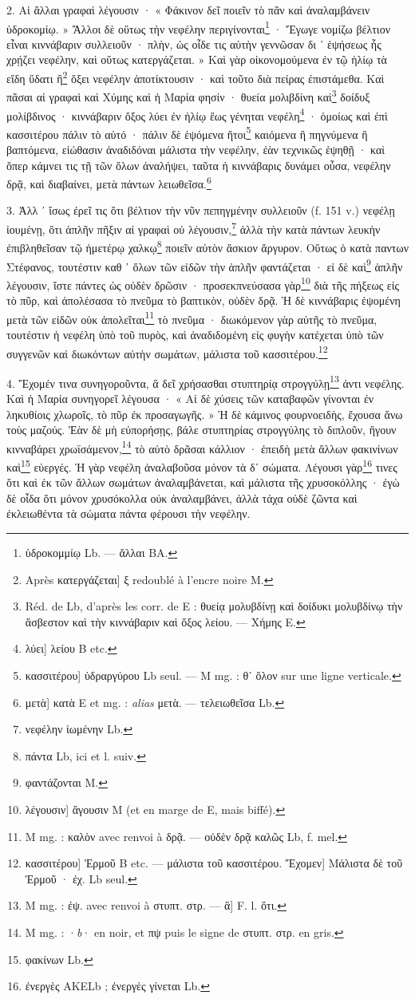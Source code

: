 \documentclass[a4paper, 11pt, oneside, polutonikogreek, french]{article}
\begin{document}
2. Αἱ ἄλλαι γραφαὶ λέγουσιν · « Φάκινον δεῖ ποιεῖν τὸ πᾶν καὶ ἀναλαμβάνειν ὑδροκομίῳ. » Ἄλλοι δὲ οὕτως τὴν νεφέλην περιγίνονται\footnote{ὑδροκομμίῳ Lb. --- ἄλλαι BA.} · Ἔγωγε νομίζω βέλτιον εἶναι κιννάβαριν συλλειοῦν · πλὴν, ὡς οἶδε τις αὐτὴν γεννῶσαν δι ᾽ ἑψήσεως ἧς χρῄζει νεφέλην, καὶ οὕτως κατεργάζεται. » Καὶ γὰρ οἰκονομούμενα ἐν τῷ ἡλίῳ τὰ εἴδη ὕδατι ἢ\footnote{Après κατεργάζεται] ξ redoublé à l'encre noire M.} ὄξει νεφέλην ἀποτίκτουσιν · καὶ τοῦτο διὰ πείρας ἐπιστάμεθα. Καὶ πᾶσαι αἱ γραφαὶ καὶ Χύμης καὶ ἡ Μαρία φησίν · θυεία μολιβδίνη καὶ\footnote{Réd. de Lb, d'après les corr. de E : θυείᾳ μολυβδίνῃ καὶ δοίδυκι μολυβδίνῳ τὴν ἄσβεστον καὶ τὴν κιννάβαριν καὶ ὄξος λείου. --- Χήμης E.} δοίδυξ μολίβδινος · κιννάβαριν ὄξος λύει ἐν ἡλίῳ ἕως γένηται νεφέλη\footnote{λύει] λείου B etc.} · ὁμοίως καὶ ἐπὶ κασσιτέρου πάλιν τὸ αὐτό · πάλιν δὲ ἑψόμενα ἤτοι\footnote{κασσιτέρου] ὑδραργύρου Lb seul. --- M mg. : θʹ ὅλον sur une ligne verticale.} καιόμενα ἢ πηγνύμενα ἢ βαπτόμενα, εἰώθασιν ἀναδιδόναι μάλιστα τὴν νεφέλην, ἐὰν τεχνικῶς ἑψηθῇ · καὶ ὅπερ κάμνει τις τῇ τῶν ὅλων ἀναλήψει, ταῦτα ἡ κιννάβαρις δυνάμει οὖσα, νεφέλην δρᾷ, καὶ διαβαίνει, μετὰ πάντων λειωθεῖσα.\footnote{μετὰ] κατὰ E et mg. : \emph{alias} μετὰ. --- τελειωθεῖσα Lb.}

3. Ἀλλ ᾽ ἴσως ἐρεῖ τις ὅτι βέλτιον τὴν νῦν πεπηγμένην συλλειοῦν (f. 151 v.) νεφέλῃ ἰουμένῃ, ὅτι ἁπλῆν πῆξιν αἱ γραφαὶ οὐ λέγουσιν,\footnote{νεφέλην ἰωμένην Lb.} ἀλλὰ τὴν κατὰ πάντων λευκὴν ἐπιβληθεῖσαν τῷ ἡμετέρῳ χαλκῳ\footnote{πάντα Lb, ici et l. suiv.} ποιεῖν αὐτὸν ἄσκιον ἄργυρον. Οὕτως ὁ κατὰ παντων Στέφανος, τουτέστιν καθ ᾽ ὅλων τῶν εἰδῶν τὴν ἁπλῆν φαντάζεται · εἰ δὲ καὶ\footnote{φαντάζονται M.} ἁπλῆν λέγουσιν, ἴστε πάντες ὡς οὐδὲν δρῶσιν · προσεκπνεύσασα γὰρ\footnote{λέγουσιν] ἄγουσιν M (et en marge de E, mais biffé).} διὰ τῆς πήξεως εἰς τὸ πῦρ, καὶ ἀπολέσασα τὸ πνεῦμα τὸ βαπτικὸν, οὐδὲν δρᾷ. Ἡ δὲ κιννάβαρις ἑψομένη μετὰ τῶν εἰδῶν οὐκ ἀπολεῖται\footnote{M mg. : καλὸν avec renvoi à δρᾷ. --- οὐδὲν δρᾷ καλῶς Lb, f. mel.} τὸ πνεῦμα · διωκόμενον γὰρ αὐτῆς τὸ πνεῦμα, τουτέστιν ἡ νεφέλη ὑπὸ τοῦ πυρὸς, καὶ ἀναδιδομένη εἰς φυγὴν κατέχεται ὑπὸ τῶν συγγενῶν καὶ διωκόντων αὐτὴν σωμάτων, μάλιστα τοῦ κασσιτέρου.\footnote{κασσιτέρου] Ἐρμοῦ B etc. --- μάλιστα τοῦ κασσιτέρου. Ἔχομεν] Μάλιστα δὲ τοῦ Ἑρμοῦ · ἐχ. Lb seul.}

4. Ἔχομέν τινα συνηγοροῦντα, ἃ δεῖ χρήσασθαι στυπτηρίᾳ στρογγύλῃ\footnote{M mg. : ἐψ. avec renvoi à στυπτ. στρ. --- ἃ] F. l. ὅτι.} ἀντι νεφέλης. Καὶ ἡ Μαρία συνηγορεῖ λέγουσα · « Αἱ δὲ χύσεις τῶν καταβαφῶν γίνονται ἐν ληκυθίοις χλωροῖς, τὸ πῦρ ἐκ προσαγωγῆς. » Ἡ δὲ κάμινος φουρνοειδὴς, ἔχουσα ἄνω τοὺς μαζούς. Ἐὰν δὲ μὴ εὐπορήσῃς, βάλε στυπτηρίας στρογγύλης τὸ διπλοῦν, ἤγουν κινναβάρει χρωϊσάμενον,\footnote{M mg. : ·\emph{b}· en noir, et πψ puis le signe de στυπτ. στρ. en gris.} τὸ αὐτὸ δρᾶσαι κάλλιον · ἐπειδὴ μετὰ ἄλλων φακινίνων καὶ\footnote{φακίνων Lb.} εὐεργές. Ἡ γὰρ νεφέλη ἀναλαβοῦσα μόνον τὰ δʹ σώματα. Λέγουσι γὰρ\footnote{ἐνεργὲς AΚELb ; ἐνεργὲς γίνεται Lb.} τινες ὅτι καὶ ἐκ τῶν ἄλλων σωμάτων ἀναλαμβάνεται, καὶ μάλιστα τῆς χρυσοκόλλης · ἐγὼ δὲ οἶδα ὅτι μόνον χρυσόκολλα οὐκ ἀναλαμβάνει, ἀλλὰ τάχα οὐδὲ ζῶντα καὶ ἐκλειωθέντα τὰ σώματα πάντα φέρουσι τὴν νεφέλην.
\end{document}
